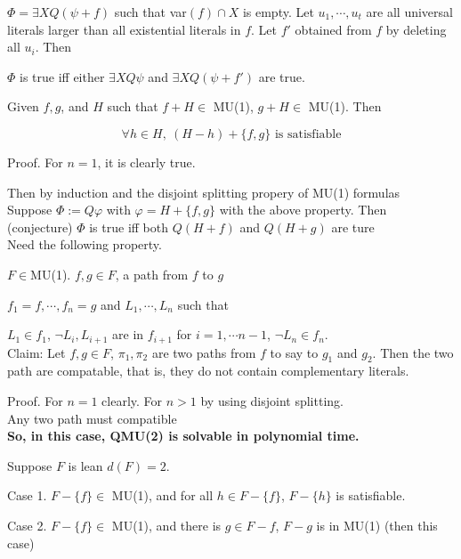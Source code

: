 \documentclass[12pt]{article}
\begin{document}
  
$\Phi=\exists X Q(\psi+f)$ such that var$(f)\cap X$ is empty. Let $u_1, \cdots, u_t$ are all universal literals larger than all existential literals in $f$. Let $f'$ obtained from $f$ by deleting all $u_i$. Then 

$\Phi$ is true iff either $\exists XQ\psi$ and $\exists X Q(\psi+f')$ are true.     
      




Given $f, g$, and $H$ such that $f+H\in$ MU(1), $g+H\in$ MU(1). Then 

$$\forall h\in H, \ (H-h)+\{f,g\} \text{ is satisfiable}$$

Proof. For $n=1$, it is clearly true. 

Then by induction and the disjoint splitting propery of MU(1) formulas \\



Suppose $\Phi:=Q\varphi$ with $\varphi=H+\{f,g\}$ with the above property.
Then (conjecture)
%
$\Phi$ is true iff both $Q(H+f)$ and $Q(H+g)$ are ture\\


Need the following property. 

$F\in $MU(1). $f, g \in F$, a path from $f$ to $g$ 

$f_1=f, \cdots, f_n=g$ and $L_1, \cdots, L_n$ such that 

$L_1\in f_1$, $\neg L_i, L_{i+1}$ are in $f_{i+1}$ for $i=1, \cdots n-1$, $\neg L_n \in f_n$. \\


Claim: Let $f,g\in F$, $\pi_1, \pi_2$ are two paths from $f$ to say to $g_1$ and $g_2$. Then the two path are compatable, that is, they do not contain complementary literals. 

Proof. For $n=1$ clearly. For $n>1$ by using disjoint splitting. 
\\

Any two path must compatible\\

{\bf So, in this case, QMU(2) is solvable in polynomial time.}


Suppose $F$ is lean $d(F)=2$. 

Case 1. $F-\{f\}\in$ MU(1), and for all $h\in F-\{f\}$, $F-\{h\}$ is satisfiable.

Case 2. $F-\{f\}\in$ MU(1), and there is $g\in F-f$, $F-g$ is in MU(1) (then this case)
\end{document}
